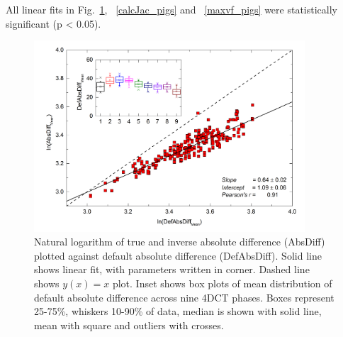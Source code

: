 \documentclass[type=dr, dr=rernat, accentcolor=tud7b,colorbacktitle, bigchapter, openright, twoside, 12pt ]{tudthesis}
\begin{document}
All linear fits in Fig.~\ref{absDiff_pigs}, ~\ref{calcJac_pigs} and ~\ref{maxvf_pigs} were statistically significant (p < 0.05).

\begin{figure}[H]
	\begin{center}		
		\includegraphics[width=0.9\textwidth]{./Images/AbsDiff_pigs.png}
		\caption{Natural logarithm of true and inverse absolute difference (AbsDiff) plotted against default absolute difference (DefAbsDiff). Solid line shows linear fit, with parameters
		written in corner. Dashed line shows $y(x)=x$ plot. Inset shows box plots of mean distribution of default absolute difference across nine 4DCT phases. Boxes represent 25-75\%, whiskers 10-90\%
		of data, median is shown with solid line, mean with square and outliers with crosses.}
		\label{absDiff_pigs}
	\end{center}
\end{figure}


\newpage
\end{document}
